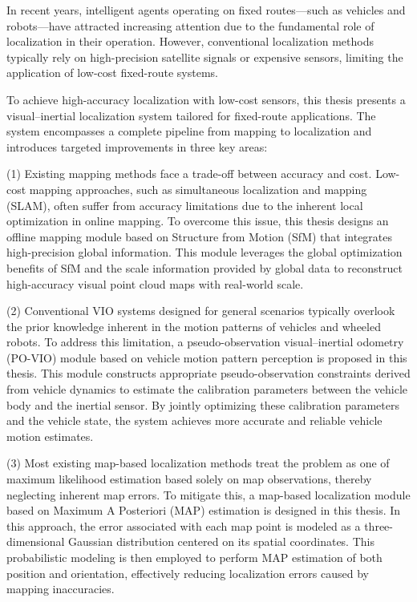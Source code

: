 \begin{abstract*}
  In recent years, intelligent agents operating on fixed routes—such as vehicles and robots—have attracted increasing attention due to the fundamental role of localization in their operation. However, conventional localization methods typically rely on high-precision satellite signals or expensive sensors, limiting the application of low-cost fixed-route systems.

  To achieve high-accuracy localization with low-cost sensors, this thesis presents a visual–inertial localization system tailored for fixed-route applications. The system encompasses a complete pipeline from mapping to localization and introduces targeted improvements in three key areas:

  (1) Existing mapping methods face a trade-off between accuracy and cost. Low-cost mapping approaches, such as simultaneous localization and mapping (SLAM), often suffer from accuracy limitations due to the inherent local optimization in online mapping. To overcome this issue, this thesis designs an offline mapping module based on Structure from Motion (SfM) that integrates high-precision global information. This module leverages the global optimization benefits of SfM and the scale information provided by global data to reconstruct high-accuracy visual point cloud maps with real-world scale.

  (2) Conventional VIO systems designed for general scenarios typically overlook the prior knowledge inherent in the motion patterns of vehicles and wheeled robots. To address this limitation, a pseudo-observation visual–inertial odometry (PO-VIO) module based on vehicle motion pattern perception is proposed in this thesis. This module constructs appropriate pseudo-observation constraints derived from vehicle dynamics to estimate the calibration parameters between the vehicle body and the inertial sensor. By jointly optimizing these calibration parameters and the vehicle state, the system achieves more accurate and reliable vehicle motion estimates.

  (3) Most existing map-based localization methods treat the problem as one of maximum likelihood estimation based solely on map observations, thereby neglecting inherent map errors. To mitigate this, a map-based localization module based on Maximum A Posteriori (MAP) estimation is designed in this thesis. In this approach, the error associated with each map point is modeled as a three-dimensional Gaussian distribution centered on its spatial coordinates. This probabilistic modeling is then employed to perform MAP estimation of both position and orientation, effectively reducing localization errors caused by mapping inaccuracies.


\end{abstract*}
